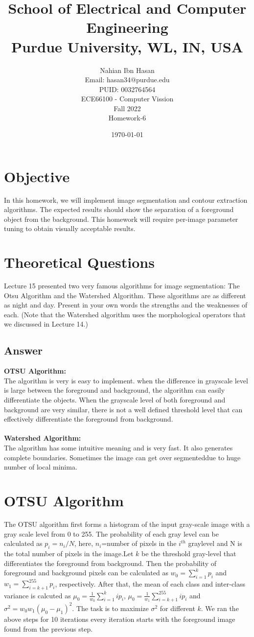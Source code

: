 \documentclass{article}
\title{School of Electrical and Computer Engineering\\
Purdue University, WL, IN, USA}
\author{Nahian Ibn Hasan\\
Email: hasan34@purdue.edu\\
PUID: 0032764564\\
ECE66100 - Computer Vission\\
Fall 2022\\
Homework-6}
\date{\today}
\begin{document}
\maketitle
\section{Objective}
In this homework, we will implement image segmentation and contour extraction algorithms. The expected results should show the separation of a foreground object from the background. This homework will require per-image parameter tuning to obtain visually acceptable results.
\section{Theoretical Questions}
Lecture 15 presented two very famous algorithms for image segmentation: The Otsu Algorithm and the Watershed Algorithm. These algorithms are as different as night and day. Present in your own words the strengths and the weaknesses of each. (Note that the Watershed algorithm uses the morphological operators that we discussed in Lecture 14.)
\subsection*{Answer}
\textbf{OTSU Algorithm:}\\
The algorithm is very is easy to implement. when the difference in grayscale level is large between the foreground and background, the algorithm can easily differentiate the objects. When the grayscale level of both foreground and background are very similar, there is not a well defined threshold level that can effectively differentiate the foreground from background.\\
\\
\textbf{Watershed Algorithm:}\\
The algorithm has some intuitive meaning and is very fast. It also generates complete boundaries. Sometimes the image can get over segmenteddue to huge number of local minima.


\section{OTSU Algorithm}
The OTSU algorithm first forms a histogram of the input gray-scale image with a gray scale level from 0 to 255. The probability of each gray level can be calculated as $p_i = n_i/N$, here, $n_i$=number of pixels in the $i^{th}$ graylevel and N is the total number of pixels in the image.Let $k$ be the threshold gray-level that differentiates the foreground from background. Then the probability of foreground and background pixels can be calculated as $w_0=\sum\limits_{i=1}^{k}p_i$ and $w_1=\sum\limits_{i=k+1}^{255}p_i$, respectively. After that, the mean of each class and inter-class variance is calcuted as $\mu_0 = \frac{1}{w_0}\sum\limits_{i=1}^{k}ip_i$, $\mu_0 = \frac{1}{w_1}\sum\limits_{i=k+1}^{255}ip_i$ and $\sigma^2=w_0w_1(\mu_0-\mu_1)^2$. The task is to maximize $\sigma^2$ for different $k$. We ran the above steps for 10 iterations every iteration starts with the foreground image found from the previous step.
\end{document}

